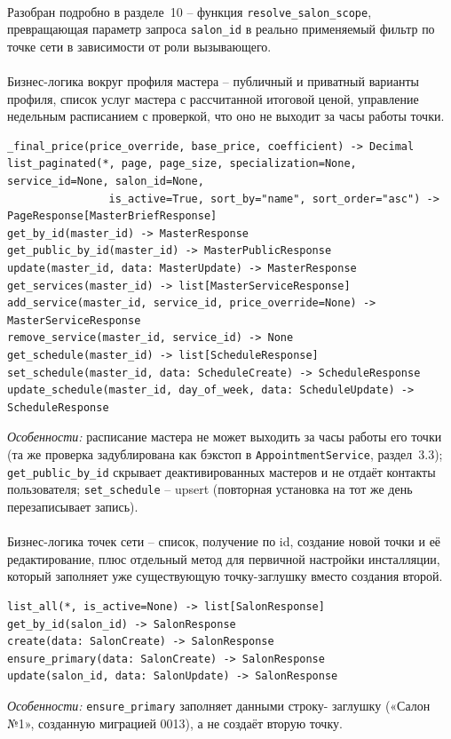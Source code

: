 \paragraph{}
Разобран подробно в разделе~10 -- функция \texttt{resolve_salon_scope},
превращающая параметр запроса \texttt{salon_id} в реально применяемый
фильтр по точке сети в зависимости от роли вызывающего.

\paragraph{}
Бизнес-логика вокруг профиля мастера -- публичный и приватный варианты
профиля, список услуг мастера с рассчитанной итоговой ценой, управление
недельным расписанием с проверкой, что оно не выходит за часы работы
точки.
\begin{verbatim}
_final_price(price_override, base_price, coefficient) -> Decimal
list_paginated(*, page, page_size, specialization=None, service_id=None, salon_id=None,
                is_active=True, sort_by="name", sort_order="asc") -> PageResponse[MasterBriefResponse]
get_by_id(master_id) -> MasterResponse
get_public_by_id(master_id) -> MasterPublicResponse
update(master_id, data: MasterUpdate) -> MasterResponse
get_services(master_id) -> list[MasterServiceResponse]
add_service(master_id, service_id, price_override=None) -> MasterServiceResponse
remove_service(master_id, service_id) -> None
get_schedule(master_id) -> list[ScheduleResponse]
set_schedule(master_id, data: ScheduleCreate) -> ScheduleResponse
update_schedule(master_id, day_of_week, data: ScheduleUpdate) -> ScheduleResponse
\end{verbatim}
\textit{Особенности:} расписание мастера не может выходить за часы
работы его точки (та же проверка задублирована как бэкстоп в
\texttt{AppointmentService}, раздел~3.3); \texttt{get_public_by_id}
скрывает деактивированных мастеров и не отдаёт контакты пользователя;
\texttt{set_schedule} -- upsert (повторная установка на тот же день
перезаписывает запись).

\paragraph{}
Бизнес-логика точек сети -- список, получение по id, создание новой точки
и её редактирование, плюс отдельный метод для первичной настройки
инсталляции, который заполняет уже существующую точку-заглушку вместо
создания второй.
\begin{verbatim}
list_all(*, is_active=None) -> list[SalonResponse]
get_by_id(salon_id) -> SalonResponse
create(data: SalonCreate) -> SalonResponse
ensure_primary(data: SalonCreate) -> SalonResponse
update(salon_id, data: SalonUpdate) -> SalonResponse
\end{verbatim}
\textit{Особенности:} \texttt{ensure_primary} заполняет данными строку-
заглушку («Салон №1», созданную миграцией 0013), а не создаёт вторую
точку.

